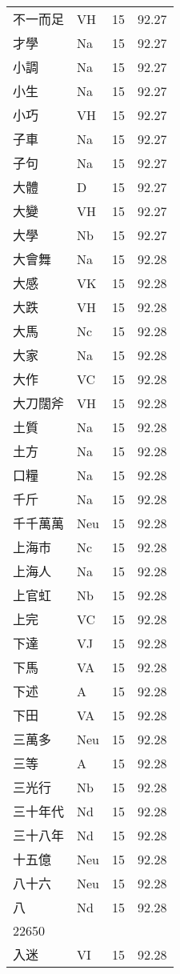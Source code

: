 \documentclass[twocolumn]{book}
\begin{document}
\begin{supertabular}{llrr}
不一而足 & VH & 15 &  92.27\\
才學 & Na & 15 &  92.27\\
小調 & Na & 15 &  92.27\\
小生 & Na & 15 &  92.27\\
小巧 & VH & 15 &  92.27\\
子車 & Na & 15 &  92.27\\
子句 & Na & 15 &  92.27\\
大體 & D & 15 &  92.27\\
大變 & VH & 15 &  92.27\\
大學 & Nb & 15 &  92.27\\
大會舞 & Na & 15 &  92.28\\
大感 & VK & 15 &  92.28\\
大跌 & VH & 15 &  92.28\\
大馬 & Nc & 15 &  92.28\\
大家 & Na & 15 &  92.28\\
大作 & VC & 15 &  92.28\\
大刀闊斧 & VH & 15 &  92.28\\
土質 & Na & 15 &  92.28\\
土方 & Na & 15 &  92.28\\
口糧 & Na & 15 &  92.28\\
千斤 & Na & 15 &  92.28\\
千千萬萬 & Neu & 15 &  92.28\\
上海市 & Nc & 15 &  92.28\\
上海人 & Na & 15 &  92.28\\
上官虹 & Nb & 15 &  92.28\\
上完 & VC & 15 &  92.28\\
下達 & VJ & 15 &  92.28\\
下馬 & VA & 15 &  92.28\\
下述 & A & 15 &  92.28\\
下田 & VA & 15 &  92.28\\
三萬多 & Neu & 15 &  92.28\\
三等 & A & 15 &  92.28\\
三光行 & Nb & 15 &  92.28\\
三十年代 & Nd & 15 &  92.28\\
三十八年 & Nd & 15 &  92.28\\
十五億 & Neu & 15 &  92.28\\
八十六 & Neu & 15 &  92.28\\
八 & Nd & 15 &  92.28\\
22650\\
入迷 & VI & 15 &  92.28\\

\end{supertabular}
\end{document}
